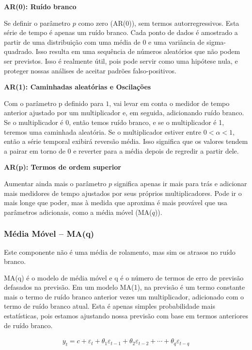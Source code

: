 \textbf{AR(0): Ru\'ido branco}

Se definir o parâmetro $p$ como zero (AR($0$)), sem termos autorregressivos. Esta série de tempo é apenas um ruído branco. Cada ponto de dados é amostrado a partir de uma distribuição com uma média de $0$ e uma variância de sigma-quadrado. Isso resulta em uma sequência de números aleatórios que não podem ser previstos. Isso é realmente útil, pois pode servir como uma hipótese nula, e proteger nossas análises de aceitar padrões falso-positivos.

\textbf{AR(1): Caminhadas aleat\'orias e Oscila\c c\~oes}



Com o parâmetro p definido para $1$, vai levar em conta o medidor de tempo anterior ajustado por um multiplicador e, em seguida, adicionando ruído branco. Se o multiplicador é $0$, então temos ruído branco, e se o multiplicador é 1, teremos uma caminhada aleatória. Se o multiplicador estiver entre $ 0 < \alpha < 1 $, então a série temporal exibirá reversão média. Isso significa que os valores tendem a pairar em torno de 0 e reverter para a média depois de regredir a partir dele.

\textbf{AR(p): Termos de ordem superior}

Aumentar ainda mais o parâmetro $p$ significa apenas ir mais para trás e adicionar mais medidores de tempo ajustados por seus próprios multiplicadores. Pode ir o mais longe que poder, mas à medida que aproxima é mais provável que usa parâmetros adicionais, como a média móvel (MA($q$)).

\subsubsection{M\'edia M\'ovel -- MA(q)}\label{subsubsec:ma}
Este componente não é uma média de rolamento, mas sim os atrasos no ruído branco. 


MA(q) é o modelo de média móvel e q é o número de termos de erro de previsão defasados na previsão. Em um modelo MA(1), na previsão é um termo constante mais o termo de ruído branco anterior vezes um multiplicador, adicionado com o termo de ruído branco atual. Esta é apenas simples probabilidade mais estatísticas, pois estamos ajustando nossa previsão com base em termos anteriores de ruído branco.

\begin{eqnarray}
	y_t=c+\varepsilon_t+\theta_1 \varepsilon_{t-1}+\theta_2 \varepsilon_{t-2}+\cdots+\theta_q \varepsilon_{t-q}\label{eq:ma}
\end{eqnarray}

